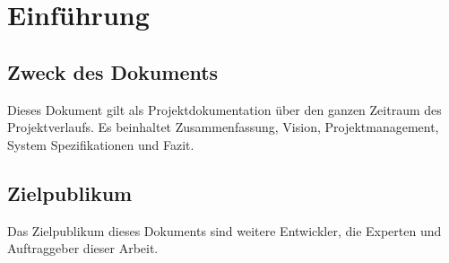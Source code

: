 \section{Einführung}
		\subsection{Zweck des Dokuments}
            Dieses Dokument gilt als Projektdokumentation über den ganzen Zeitraum des Projektverlaufs. Es beinhaltet Zusammenfassung, Vision, Projektmanagement, System Spezifikationen und Fazit.
		\subsection{Zielpublikum}
            Das Zielpublikum dieses Dokuments sind weitere Entwickler, die Experten und Auftraggeber dieser Arbeit.
